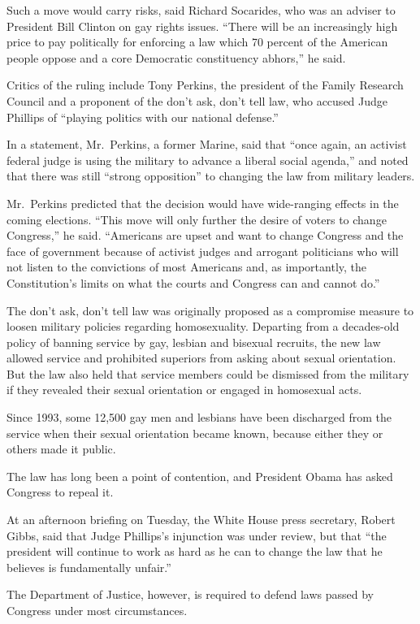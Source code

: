 ﻿\documentclass[12pt]{article}
\begin{document}
Such a move would carry risks, said Richard Socarides, who was an adviser to President Bill Clinton
on gay rights issues. ``There will be an increasingly high price to pay politically for enforcing a
law which 70 percent of the American people oppose and a core Democratic constituency abhors,'' he
said.

Critics of the ruling include Tony Perkins, the president of the Family Research Council and a
proponent of the don't ask, don't tell law, who accused Judge Phillips of ``playing politics with
our national defense.''

In a statement, Mr.~Perkins, a former Marine, said that ``once again, an activist federal judge is
using the military to advance a liberal social agenda,'' and noted that there was still ``strong
opposition'' to changing the law from military leaders.

Mr.~Perkins predicted that the decision would have wide-ranging effects in the coming elections.
``This move will only further the desire of voters to change Congress,'' he said. ``Americans are
upset and want to change Congress and the face of government because of activist judges and arrogant
politicians who will not listen to the convictions of most Americans and, as importantly, the
Constitution's limits on what the courts and Congress can and cannot do.''

The don't ask, don't tell law was originally proposed as a compromise measure to loosen military
policies regarding homosexuality. Departing from a decades-old policy of banning service by gay,
lesbian and bisexual recruits, the new law allowed service and prohibited superiors from asking
about sexual orientation. But the law also held that service members could be dismissed from the
military if they revealed their sexual orientation or engaged in homosexual acts.

Since 1993, some 12,500 gay men and lesbians have been discharged from the service when their sexual
orientation became known, because either they or others made it public.

The law has long been a point of contention, and President Obama has asked Congress to repeal it.

At an afternoon briefing on Tuesday, the White House press secretary, Robert Gibbs, said that Judge
Phillips's injunction was under review, but that ``the president will continue to work as hard as he
can to change the law that he believes is fundamentally unfair.''

The Department of Justice, however, is required to defend laws passed by Congress under most
circumstances.
\end{document}
